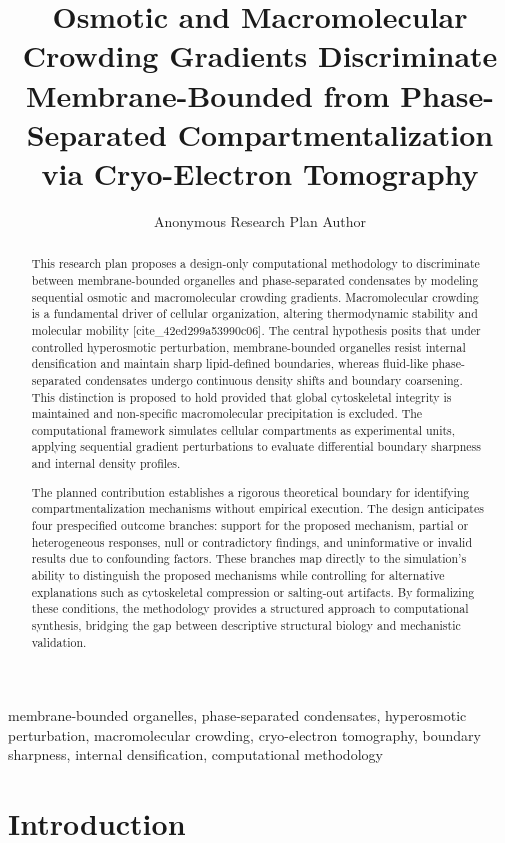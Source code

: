 \documentclass[conference]{IEEEtran}
\begin{document}
\title{Osmotic and Macromolecular Crowding Gradients Discriminate Membrane-Bounded from Phase-Separated Compartmentalization via Cryo-Electron Tomography}\author{Anonymous Research Plan Author}\maketitle

\begin{abstract}
This research plan proposes a design-only computational methodology to discriminate between membrane-bounded organelles and phase-separated condensates by modeling sequential osmotic and macromolecular crowding gradients. Macromolecular crowding is a fundamental driver of cellular organization, altering thermodynamic stability and molecular mobility [cite\_42ed299a53990c06]. The central hypothesis posits that under controlled hyperosmotic perturbation, membrane-bounded organelles resist internal densification and maintain sharp lipid-defined boundaries, whereas fluid-like phase-separated condensates undergo continuous density shifts and boundary coarsening. This distinction is proposed to hold provided that global cytoskeletal integrity is maintained and non-specific macromolecular precipitation is excluded. The computational framework simulates cellular compartments as experimental units, applying sequential gradient perturbations to evaluate differential boundary sharpness and internal density profiles.

The planned contribution establishes a rigorous theoretical boundary for identifying compartmentalization mechanisms without empirical execution. The design anticipates four prespecified outcome branches: support for the proposed mechanism, partial or heterogeneous responses, null or contradictory findings, and uninformative or invalid results due to confounding factors. These branches map directly to the simulation's ability to distinguish the proposed mechanisms while controlling for alternative explanations such as cytoskeletal compression or salting-out artifacts. By formalizing these conditions, the methodology provides a structured approach to computational synthesis, bridging the gap between descriptive structural biology and mechanistic validation.
\end{abstract}
\begin{IEEEkeywords}
membrane-bounded organelles, phase-separated condensates, hyperosmotic perturbation, macromolecular crowding, cryo-electron tomography, boundary sharpness, internal densification, computational methodology
\end{IEEEkeywords}\section{Introduction}
\end{document}
